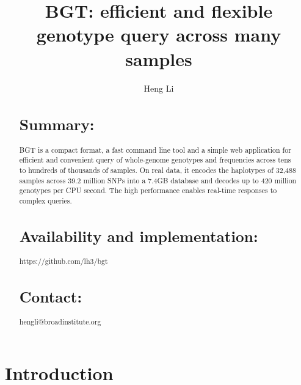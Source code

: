 \documentclass{bioinfo}
\begin{document}

\title[Large-scale Genotype Query]{BGT: efficient and flexible genotype query across many samples}

\author[Li]{Heng Li}

\address{Broad Institute, 7 Cambridge Center, Cambridge, MA 02142, USA}

\maketitle

\begin{abstract}
\section{Summary:} BGT is a compact format, a fast command line tool and a
simple web application for efficient and convenient query of whole-genome
genotypes and frequencies across tens to hundreds of thousands of samples.
On real data, it encodes the haplotypes of 32,488 samples across 39.2
million SNPs into a 7.4GB database and decodes up to 420 million
genotypes per CPU second. The high performance enables real-time responses to
complex queries.

\section{Availability and implementation:} https://github.com/lh3/bgt

\section{Contact:} hengli@broadinstitute.org
\end{abstract}

\section{Introduction}
\end{document}
